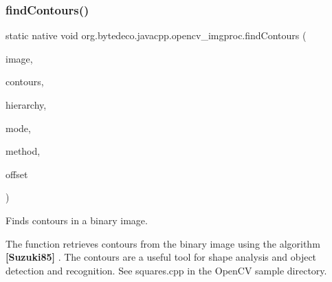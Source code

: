 \subsubsection{\texorpdfstring{find\+Contours()}{fr.antproject.utils.findContours()}\hspace{0.1cm}{\footnotesize\ttfamily [1/2]}}
{\footnotesize\ttfamily static native void org.\+bytedeco.\+javacpp.\+opencv\+\_\+imgproc.\+find\+Contours (\begin{DoxyParamCaption}\item[{@By\+Val Mat}]{image,  }\item[{@By\+Val Mat\+Vector}]{contours,  }\item[{@By\+Val Mat}]{hierarchy,  }\item[{int}]{mode,  }\item[{int}]{method,  }\item[{@By\+Val(null\+Value=\char`\"{}cv\+::\+fr.antproject.utils.Point()\char`\"{}) fr.antproject.utils.Point}]{offset }\end{DoxyParamCaption})\hspace{0.3cm}{\ttfamily [static]}}



Finds contours in a binary image. 

The function retrieves contours from the binary image using the algorithm {\bfseries [Suzuki85]} . The contours are a useful tool for shape analysis and object detection and recognition. See squares.\+cpp in the Open\+CV sample directory. 


